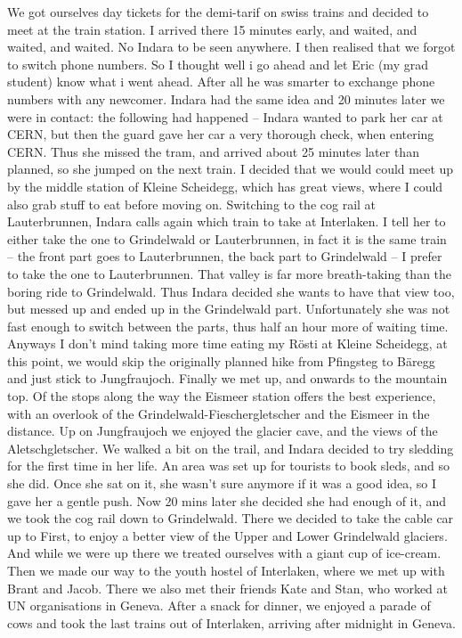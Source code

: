  We got ourselves day tickets for the demi-tarif on swiss trains and decided to meet at the train station. I arrived there 15 minutes early, and waited, and waited, and waited. No Indara to be seen anywhere. I then realised that we forgot to switch phone numbers. So I thought well i go ahead and let Eric (my grad student) know what i went ahead. After all he was smarter to exchange phone numbers with any newcomer. Indara had the same idea and 20 minutes later we were in contact: the following had happened -- Indara wanted to park her car at CERN, but then the guard gave her car a very thorough check, when entering CERN. Thus she missed the tram, and arrived about 25 minutes later than planned, so she jumped on the next train. I decided that we would could meet up by the middle station of Kleine Scheidegg, which has great views, where I could also grab stuff to eat before moving on. Switching to the cog rail at Lauterbrunnen, Indara calls again which train to take at Interlaken. I tell her to either take the one to Grindelwald or Lauterbrunnen, in fact it is the same train -- the front part goes to Lauterbrunnen, the back part to Grindelwald -- I prefer to take the one to Lauterbrunnen. That valley is far more breath-taking than the boring ride to Grindelwald. Thus Indara decided she wants to have that view too, but messed up and ended up in the Grindelwald part. Unfortunately she was not fast enough to switch between the parts, thus half an hour more of waiting time. Anyways I don't mind taking more time eating my R\"osti at Kleine Scheidegg, at this point, we would skip the originally planned hike from Pfingsteg to B\"aregg and just stick to Jungfraujoch. Finally we met up, and onwards to the mountain top. Of the stops along the way the Eismeer station offers the best experience, with an overlook of the Grindelwald-Fieschergletscher and the Eismeer in the distance. Up on Jungfraujoch we enjoyed the glacier cave, and the views of the Aletschgletscher. We walked a bit on the trail, and Indara decided to try sledding for the first time in her life. An area was set up for tourists to book sleds, and so she did. Once she sat on it, she wasn't sure anymore if it was a good idea, so I gave her a gentle push. Now 20 mins later she decided she had enough of it, and we took the cog rail down to Grindelwald. There we decided to take the cable car up to First, to enjoy a better view of the Upper and Lower Grindelwald glaciers. And while we were up there we treated ourselves with a giant cup of ice-cream. Then we made our way to the youth hostel of Interlaken, where we met up with Brant and Jacob. There we also met their friends Kate and Stan, who worked at UN organisations in Geneva. After a snack for dinner, we enjoyed a parade of cows and took the last trains out of Interlaken, arriving after midnight in Geneva.\\

